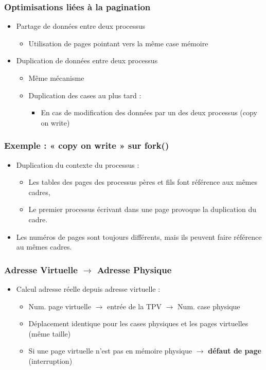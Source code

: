 \begin{frame}
\frametitle{Optimisations liées à la pagination}
\begin{itemize}
\item Partage de données entre deux processus
\begin{itemize}
\item Utilisation de pages pointant vers la même case mémoire
\end{itemize}
\item Duplication de données entre deux processus
\begin{itemize}
\item Même mécanisme
\item Duplication des cases au plus tard :
\begin{itemize}
\item En cas de modification des données par un des deux processus (copy on write)
\end{itemize}
\end{itemize}
\end{itemize}
\end{frame}

\begin{frame}
\frametitle{Exemple : « copy on write » sur fork()}
\begin{itemize}
\item Duplication du contexte du processus :
\begin{itemize}
\item Les tables des pages des processus pères et fils font référence aux mêmes cadres,
\item Le premier processus écrivant dans une page provoque la duplication du cadre.
\end{itemize}
\item Les numéros de pages sont toujours différents, mais ils peuvent faire référence au mêmes cadres.
\end{itemize}
\end{frame}

\begin{frame}
\frametitle{Adresse Virtuelle $\rightarrow$ Adresse Physique}
\begin{itemize}
\item Calcul adresse réelle depuis adresse virtuelle :
\begin{itemize}
\item Num. page virtuelle $\rightarrow$ entrée de la TPV $\rightarrow$ Num. case physique
\item Déplacement identique pour les cases physiques et les pages virtuelles (même taille)
\item Si une page virtuelle n'est pas en mémoire physique $\rightarrow$ \textbf{défaut de page} (interruption)
\end{itemize}
\end{itemize}
\end{frame}


